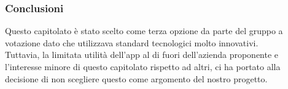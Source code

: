\documentclass[a4paper, 11pt]{article}
\begin{document}
\subsubsection{Conclusioni}

Questo capitolato è stato scelto come terza opzione da parte del gruppo a votazione dato che utilizzava standard tecnologici molto innovativi. \\
Tuttavia, la limitata utilità dell'app al di fuori dell'azienda proponente e l'interesse minore di questo capitolato rispetto ad altri, ci ha portato alla decisione di non scegliere questo come argomento del nostro progetto.





































        
\end{document}
